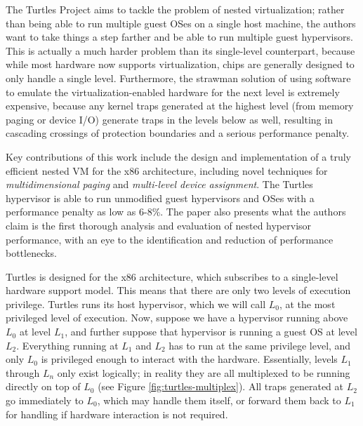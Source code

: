 \documentclass[letterpaper, twocolumn]{article}
\begin{document}
The Turtles Project \cite{ref:turtles} aims to tackle the problem of
nested virtualization; rather than being able to run multiple guest OSes
on a single host machine, the authors want to take things a step farther
and be able to run multiple guest hypervisors.  This is actually a
much harder problem than its single-level counterpart, because while
most hardware now supports virtualization, chips are generally designed
to only handle a single level.  Furthermore, the strawman solution of
using software to emulate the virtualization-enabled hardware for the next level is
extremely expensive, because any kernel traps generated at the highest
level (from memory paging or device I/O) generate traps in the levels
below as well, resulting in cascading crossings of protection
boundaries and a serious performance penalty.

Key contributions of this work include the design and implementation
of a truly efficient nested VM for the x86 architecture, including novel
techniques for \emph{multidimensional paging} and
\emph{multi-level device assignment}.  The Turtles hypervisor is able to
run unmodified guest hypervisors and OSes with a performance penalty
as low as 6-8\%.  The paper also presents what the authors claim is the
first thorough analysis and evaluation of nested hypervisor performance,
with an eye to the identification and reduction of performance bottlenecks. %

Turtles is designed for the x86 architecture, which subscribes to a
single-level hardware support model.  This means that there are only two
levels of execution privilege.  Turtles runs its host hypervisor, which
we will call $L_0$, at the most privileged level of execution.  Now, suppose
we have a hypervisor running above $L_0$ at level $L_1$, and further suppose 
that hypervisor is running a guest OS at level $L_2$.  Everything running at $L_1$
and $L_2$ has to run at the same privilege level, and only $L_0$ is privileged enough
to interact with the hardware.  Essentially, levels $L_1$ through $L_n$ only
exist logically; in reality they are all multiplexed to be running directly
on top of $L_0$ (see Figure \ref{fig:turtles-multiplex}).  All traps generated at
$L_2$ go immediately to $L_0$, which may handle them itself, or forward them
back to $L_1$ for handling if hardware interaction is not required.
\end{document}
